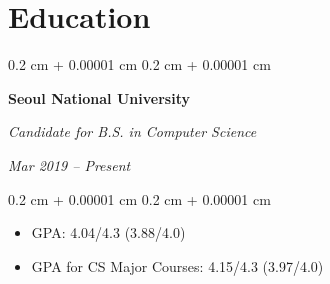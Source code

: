 \documentclass[10pt, letterpaper]{article}
\newenvironment{highlights}{
    \begin{itemize}[
        topsep=0.10 cm,
        parsep=0.10 cm,
        partopsep=0pt,
        itemsep=0pt,
        leftmargin=0.4 cm + 10pt
    ]
}{
    \end{itemize}
} %
\newenvironment{highlightsforbulletentries}{
    \begin{itemize}[
        topsep=0.10 cm,
        parsep=0.10 cm,
        partopsep=0pt,
        itemsep=0pt,
        leftmargin=10pt
    ]
}{
    \end{itemize}
} %
\newenvironment{onecolentry}{
    \begin{adjustwidth}{
        0.2 cm + 0.00001 cm
    }{
        0.2 cm + 0.00001 cm
    }
}{
    \end{adjustwidth}
} %
\newenvironment{twocolentry}[2][]{
    \onecolentry
    \def\secondColumn{#2}
    \setcolumnwidth{\fill, 4.5 cm}
    \begin{paracol}{2}
}{
    \switchcolumn \raggedleft \secondColumn
    \end{paracol}
    \endonecolentry
} %
\let\hrefWithoutArrow\href
\renewcommand{\href}[2]{\hrefWithoutArrow{#1}{\ifthenelse{\equal{#2}{}}{ }{#2 }\raisebox{.15ex}{\footnotesize \faExternalLink*}}}
\begin{document}


    










    \section{Education}
        
        \begin{twocolentry}{    
        \textit{Mar 2019 – Present}}
            \textbf{Seoul National University}

            \textit{Candidate for B.S. in Computer Science}
        \end{twocolentry}

        \vspace{0.10 cm}
        \begin{onecolentry}
            \begin{highlights}
                \item GPA: 4.04/4.3 (3.88/4.0)
                \item GPA for CS Major Courses: 4.15/4.3 (3.97/4.0)
            \end{highlights}
        \end{onecolentry}
\end{document}
